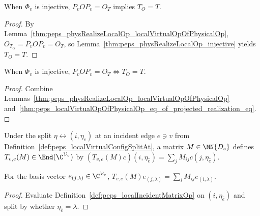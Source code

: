 \begin{lemma}%
    \label{thm:peps_localVirtualOpOfPhysicalOp_eq_of_projected_realization_eq}
    \leanok
    When $\Phi_v$ is injective, $P_vOP_v=O_T$ implies $T_O=T$.
\end{lemma}
\begin{proof}\leanok
    By Lemma~\ref{thm:peps_physRealizeLocalOp_localVirtualOpOfPhysicalOp},
    $O_{T_O}=P_vOP_v=O_T$, so Lemma~\ref{thm:peps_physRealizeLocalOp_injective}
    yields $T_O=T$.
\end{proof}

\begin{lemma}%
    \label{thm:peps_localVirtualOpOfPhysicalOp_eq_iff_projected_realization_eq}
    \leanok
    When $\Phi_v$ is injective, $P_vOP_v=O_T\iff T_O=T$.
\end{lemma}
\begin{proof}\leanok
    Combine Lemmas~\ref{thm:peps_physRealizeLocalOp_localVirtualOpOfPhysicalOp}
    and~\ref{thm:peps_localVirtualOpOfPhysicalOp_eq_of_projected_realization_eq}.
\end{proof}

\begin{definition}%
    \label{def:peps_localIncidentMatrixOp}
    \leanok
    Under the split $\eta\leftrightarrow(i,\eta_{\widehat e})$ at an incident
    edge $e\ni v$ from Definition~\ref{def:peps_localVirtualConfigSplitAt}, a
    matrix $M\in\MN{D_e}$ defines $T_{v,e}(M)\in\End(\C^{\mathcal V_v})$ by
    $(T_{v,e}(M)c)(i,\eta_{\widehat e})=\sum_j M_{ij}c(j,\eta_{\widehat e})$.
\end{definition}

\begin{lemma}%
    \label{thm:peps_localIncidentMatrixOp_single}
    \leanok
    For the basis vector $e_{(j,\lambda)}\in\C^{\mathcal V_v}$,
    $T_{v,e}(M)e_{(j,\lambda)}=\sum_i M_{ij}e_{(i,\lambda)}$.
\end{lemma}
\begin{proof}\leanok
    Evaluate Definition~\ref{def:peps_localIncidentMatrixOp} on $(i,\eta_{\widehat e})$
    and split by whether $\eta_{\widehat e}=\lambda$.
\end{proof}


